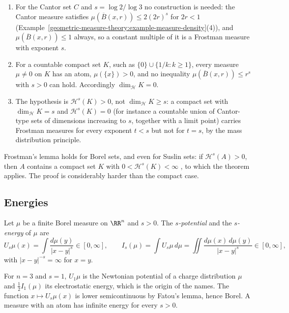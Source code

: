 \begin{example}\label{geometric-measure-theory:example-frostman}
\begin{enumerate}
\item For the Cantor set $C$ and $s = \log 2/\log 3$ no construction is needed: the Cantor measure satisfies $\mu(\overline{B}(x, r)) \leq 2(2r)^s$ for $2r < 1$
(Example~\ref{geometric-measure-theory:example-measure-density}(4)), and $\mu(\overline{B}(x, r)) \leq 1$ always, so a constant multiple of it is a Frostman measure with exponent $s$.
\item For a countable compact set $K$, such as $\{0\} \cup \{1/k : k \geq 1\}$, every measure $\mu \neq 0$ on $K$ has an atom, $\mu(\{x\}) > 0$, and no inequality $\mu(\overline{B}(x, r)) \leq r^s$ with
$s > 0$ can hold. Accordingly $\dim_{\mathcal{H}}K = 0$.
\item The hypothesis is $\mathcal{H}^s(K) > 0$, not $\dim_{\mathcal{H}}K \geq s$: a compact set with $\dim_{\mathcal{H}}K = s$ and $\mathcal{H}^s(K) = 0$ (for instance a countable union of Cantor-type sets of
dimensions increasing to $s$, together with a limit point) carries Frostman measures for every exponent $t < s$ but not for $t = s$, by the mass distribution principle.
\end{enumerate}
\end{example}

Frostman's lemma holds for Borel sets, and even for Suslin sets: if $\mathcal{H}^s(A) > 0$, then $A$ contains a compact set $K$ with $0 < \mathcal{H}^s(K) < \infty$ \cite[Chapter 8]{mattila-1995}, to which the
theorem applies. The proof is considerably harder than the compact case.

\subsection{Energies}\label{geometric-measure-theory:subsection-energies}

\begin{definition}\label{geometric-measure-theory:definition-energy}
Let $\mu$ be a finite Borel measure on $\RR^n$ and $s > 0$. The \emph{$s$-potential} and the \emph{$s$-energy} of $\mu$ are
\[
U_s\mu(x) = \int\frac{d\mu(y)}{|x - y|^s} \in [0, \infty], \qquad I_s(\mu) = \int U_s\mu\,d\mu = \iint\frac{d\mu(x)\,d\mu(y)}{|x - y|^s} \in [0, \infty],
\]
with $|x - y|^{-s} = \infty$ for $x = y$.
\end{definition}

For $n = 3$ and $s = 1$, $U_1\mu$ is the Newtonian potential of a charge distribution $\mu$ and $\frac12I_1(\mu)$ its electrostatic energy, which is the origin of the names. The function
$x \mapsto U_s\mu(x)$ is lower semicontinuous by Fatou's lemma, hence Borel. A measure with an atom has infinite energy for every $s > 0$.

